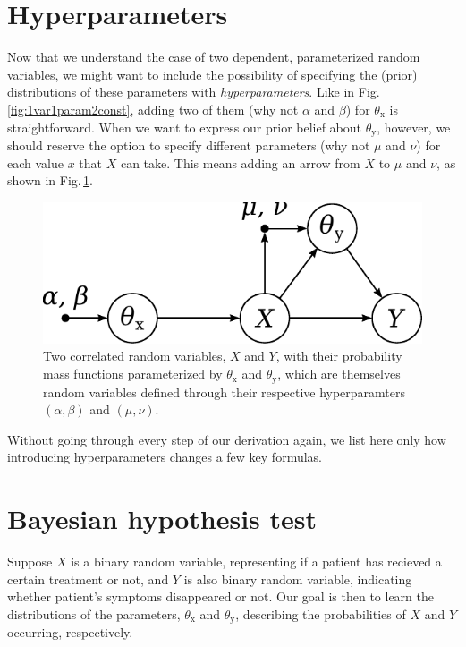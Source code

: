 \documentclass[]{report}
\begin{document}
\section{Hyperparameters}
Now that we understand the case of two dependent, parameterized random variables, we might want to include the possibility of specifying the (prior) distributions of these parameters with \emph{hyperparameters}. Like in Fig.\,\ref{fig:1var1param2const}, adding two of them (why not $\alpha$ and $\beta$) for $\theta_\mathrm{x}$ is straightforward. When we want to express our prior belief about $\theta_\mathrm{y}$, however, we should reserve the option to specify different parameters (why not $\mu$ and $\nu$) for each value $x$ that $X$ can take. This means adding an arrow from $X$ to $\mu$ and $\nu$, as shown in Fig.\,\ref{fig:2var2param4const}.
\begin{figure}[h]
	\centering
	\includegraphics[scale=0.5]{2var_2param_4const}
	\caption{Two correlated random variables, $X$ and $Y$, with their probability mass functions parameterized by $\theta_\mathrm{x}$ and $\theta_\mathrm{y}$, which are themselves random variables defined through their respective hyperparamters $(\alpha, \beta)$ and $(\mu, \nu)$.}
	\label{fig:2var2param4const}
\end{figure}

Without going through every step of our derivation again, we list here only how introducing hyperparameters changes a few key formulas.


\section{Bayesian hypothesis test}
Suppose $X$ is a binary random variable, representing if a patient has recieved a certain treatment or not, and $Y$ is also binary random variable, indicating whether patient's symptoms disappeared or not. Our goal is then to learn the distributions of the parameters, $\theta_\mathrm{x}$ and $\theta_\mathrm{y}$, describing the probabilities of $X$ and $Y$ occurring, respectively.
\end{document}
